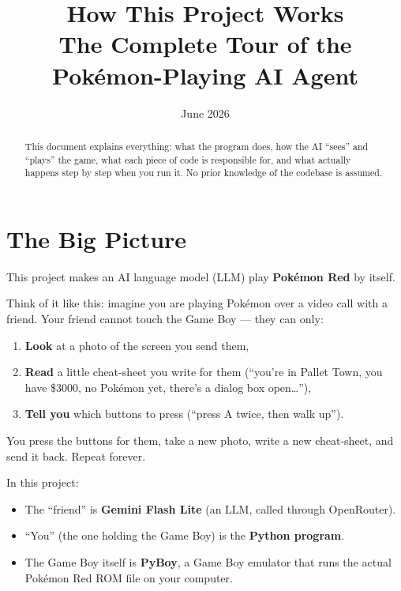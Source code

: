 \documentclass[11pt]{article}
\title{\textbf{How This Project Works}\\\large The Complete Tour of the Pokémon-Playing AI Agent}
\author{}
\date{June 2026}
\begin{document}
\maketitle

\begin{abstract}
\noindent This document explains everything: what the program does, how the AI ``sees'' and ``plays'' the game, what each piece of code is responsible for, and what actually happens step by step when you run it. No prior knowledge of the codebase is assumed.
\end{abstract}

\tableofcontents
\newpage

\section{The Big Picture}

This project makes an AI language model (LLM) play \textbf{Pokémon Red} by itself.

Think of it like this: imagine you are playing Pokémon over a video call with a friend. Your friend cannot touch the Game Boy --- they can only:

\begin{enumerate}[nosep]
  \item \textbf{Look} at a photo of the screen you send them,
  \item \textbf{Read} a little cheat-sheet you write for them (``you're in Pallet Town, you have \$3000, no Pokémon yet, there's a dialog box open\ldots''),
  \item \textbf{Tell you} which buttons to press (``press A twice, then walk up'').
\end{enumerate}

You press the buttons for them, take a new photo, write a new cheat-sheet, and send it back. Repeat forever.

In this project:

\begin{itemize}[nosep]
  \item The ``friend'' is \textbf{Gemini Flash Lite} (an LLM, called through OpenRouter).
  \item ``You'' (the one holding the Game Boy) is the \textbf{Python program}.
  \item The Game Boy itself is \textbf{PyBoy}, a Game Boy emulator that runs the actual Pokémon Red ROM file on your computer.
\end{itemize}
\end{document}
